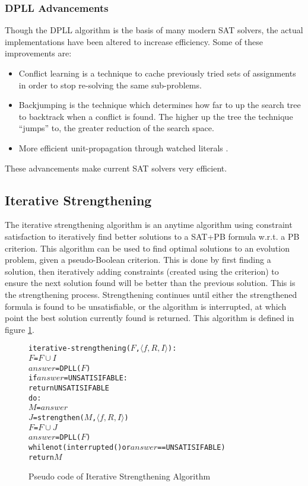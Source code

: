 \subsubsection{DPLL Advancements}
Though the DPLL algorithm is the basis of many modern SAT solvers, the actual implementations have been altered to increase efficiency.
Some of these improvements are:
\begin{itemize}
  \item Conflict learning \citep{stallman1976,sorensson2009} is a technique to cache previously tried sets of assignments in order to stop re-solving the same sub-problems.
	\item Backjumping \citep{Gaschnig1979} is the technique which determines how far to up the search tree to backtrack when a conflict is found.
The higher up the tree the technique ``jumps'' to, the greater reduction of the search space.
\item  More efficient unit-propagation through watched literals \citep{Madigan2001,Moskewicz2001}.
\end{itemize}
These advancements make current SAT solvers very efficient.

\subsection{Iterative Strengthening}
The iterative strengthening algorithm  \citep{calistri1994iterative, le2010sat4j} 
is an anytime algorithm using constraint satisfaction to iteratively find better solutions to a SAT+PB formula w.r.t. a PB criterion.
This algorithm can be used to find optimal solutions to an evolution problem, given a pseudo-Boolean criterion.
This is done by first finding a solution, then iteratively adding constraints (created using the criterion) to ensure the next solution found will be better than the previous solution.
This is the strengthening process.
Strengthening continues until either the strengthened formula is found to be unsatisfiable, or the algorithm is interrupted, at which point the best solution currently found is returned. 
This algorithm is defined in figure \ref{impl.strength}.

\begin{figure}[htp]
\begin{center}
\begin{alltt}
iterative-strengthening(\(F\),\(\langle f, R, I \rangle\)):
    \(F\) = \(F \cup I\)
    \(answer\) = DPLL(\(F\))
    if \(answer\) = UNSATISIFABLE:
        return UNSATISIFABLE
    do:
        \(M\) = \(answer\)
        \(J\) = strengthen(\(M\),\(\langle f, R, I \rangle\))
        \(F\) = \(F \cup J\)
        \(answer\) = DPLL(\(F\))
    while not (interrupted() or  \(answer\) == UNSATISIFABLE)
    return \(M\) 
\end{alltt}
  \caption{Pseudo code of Iterative Strengthening Algorithm}
  \label{impl.strength}
\end{center}
\end{figure}

